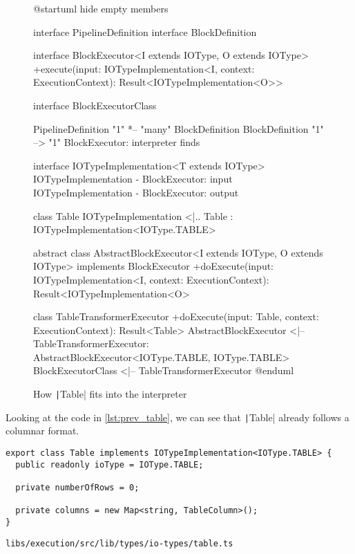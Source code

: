 \begin{figure}
	\begin{plantuml}
		@startuml
		hide empty members

		interface PipelineDefinition
		interface BlockDefinition

		interface BlockExecutor<I extends IOType, O extends IOType> {
				+execute(input: IOTypeImplementation<I\>, context: ExecutionContext): Result<IOTypeImplementation<O>>
			}

		interface BlockExecutorClass {}

		PipelineDefinition "1" *-- "many" BlockDefinition
		BlockDefinition "1" --> "1" BlockExecutor: interpreter finds

		interface IOTypeImplementation<T extends IOType>
		IOTypeImplementation - BlockExecutor: input
		IOTypeImplementation - BlockExecutor: output

		class Table
		IOTypeImplementation <|.. Table : IOTypeImplementation<IOType.TABLE>

		abstract class AbstractBlockExecutor<I extends IOType, O extends IOType> implements BlockExecutor {
				+doExecute(input: IOTypeImplementation<I\>, context: ExecutionContext): Result<IOTypeImplementation<O\>>
			}

		class TableTransformerExecutor {
				+doExecute(input: Table, context: ExecutionContext): Result<Table>
			}
		AbstractBlockExecutor <|-- TableTransformerExecutor: AbstractBlockExecutor<IOType.TABLE, IOType.TABLE>
		BlockExecutorClass <|-- TableTransformerExecutor
		@enduml
	\end{plantuml}
	\caption{How \texttt|Table| fits into the interpreter} %
	\label{fig:prev_sit}
\end{figure}

Looking at the code in \ref{lst:prev_table}, we can see that \texttt|Table| already follows a columnar format.
\begin{listing}
	\begin{verbatim}
export class Table implements IOTypeImplementation<IOType.TABLE> {
  public readonly ioType = IOType.TABLE;

  private numberOfRows = 0;

  private columns = new Map<string, TableColumn>();
}
	\end{verbatim}
	\caption{\texttt{libs/execution/src/lib/types/io-types/table.ts}} %
	\label{lst:prev_table}
\end{listing}

